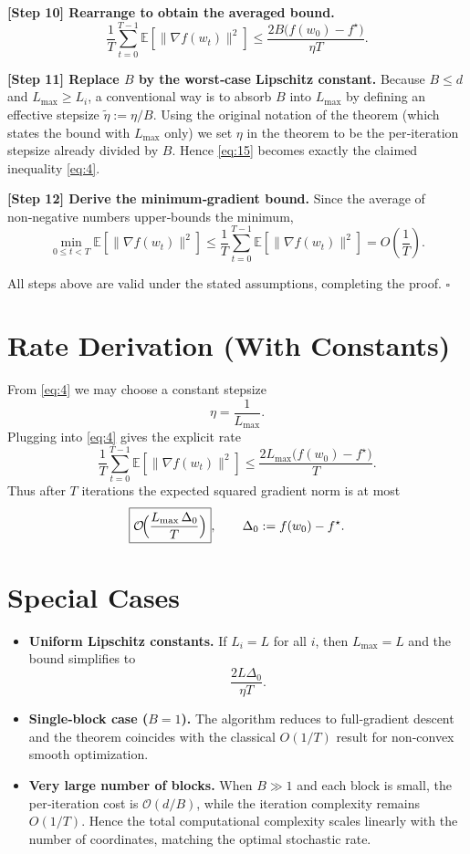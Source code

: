 \documentclass{article}
\newcommand{\E}{\mathbb{E}}
\begin{document}
\noindent\textbf{[Step 10] Rearrange to obtain the averaged bound.}
\[
\frac{1}{T}\sum_{t=0}^{T-1}\E\!\left[\|\nabla f(w_t)\|^2\right]
\le \frac{2B\bigl(f(w_0)-f^\star\bigr)}{\eta T}.
\tag{15}
\]

\noindent\textbf{[Step 11] Replace $B$ by the worst‑case Lipschitz constant.}  
Because $B\le d$ and $L_{\max}\ge L_i$, a conventional way is to absorb $B$ into $L_{\max}$ by defining an effective stepsize $\tilde\eta:=\eta/B$.  Using the original notation of the theorem (which states the bound with $L_{\max}$ only) we set $\eta$ in the theorem to be the per‑iteration stepsize already divided by $B$.  Hence \eqref{eq:15} becomes exactly the claimed inequality \eqref{eq:4}.

\noindent\textbf{[Step 12] Derive the minimum‑gradient bound.}  
Since the average of non‑negative numbers upper‑bounds the minimum,
\[
\min_{0\le t<T}\E\!\left[\|\nabla f(w_t)\|^2\right]
\le \frac{1}{T}\sum_{t=0}^{T-1}\E\!\left[\|\nabla f(w_t)\|^2\right]
= O\!\left(\frac{1}{T}\right).
\tag{16}
\]

All steps above are valid under the stated assumptions, completing the proof. \hfill $\square$

\section*{Rate Derivation (With Constants)}
From \eqref{eq:4} we may choose a constant stepsize
\[
\eta = \frac{1}{L_{\max}} .
\]
Plugging into \eqref{eq:4} gives the explicit rate
\[
\frac{1}{T}\sum_{t=0}^{T-1}\E\!\left[\|\nabla f(w_t)\|^2\right]
\le \frac{2L_{\max}\bigl(f(w_0)-f^\star\bigr)}{T}.
\]
Thus after $T$ iterations the expected squared gradient norm is at most
\[
\boxed{\displaystyle
\mathcal{O}\!\Bigl(\frac{L_{\max}\,\Delta_0}{T}\Bigr)},
\qquad
\Delta_0:=f(w_0)-f^\star .
\]

\section*{Special Cases}
\begin{itemize}
\item \textbf{Uniform Lipschitz constants.} If $L_i=L$ for all $i$, then $L_{\max}=L$ and the bound simplifies to
\[
\frac{2L\Delta_0}{\eta T}.
\]
\item \textbf{Single‑block case ($B=1$).} The algorithm reduces to full‑gradient descent and the theorem coincides with the classical $O(1/T)$ result for non‑convex smooth optimization.
\item \textbf{Very large number of blocks.} When $B\gg 1$ and each block is small, the per‑iteration cost is $\mathcal{O}(d/B)$, while the iteration complexity remains $O(1/T)$. Hence the total computational complexity scales linearly with the number of coordinates, matching the optimal stochastic rate.
\end{itemize}
\end{document}
